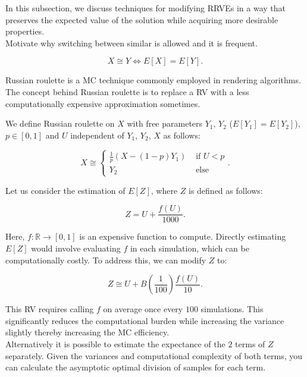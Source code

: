 \documentclass[a4paper,12pt]{article}
\begin{document}
In this subsection, we discuss techniques for modifying RRVEs
in a way that preserves the expected value of the solution while
acquiring more desirable properties. \\

Motivate why switching between similar is allowed and it is frequent.
\begin{notation}[$\cong$]
    \[
        X \cong Y \iff E[X]=E[Y]
        .\]
\end{notation}

Russian roulette is a MC technique commonly employed in rendering algorithms.
The concept behind Russian roulette is to replace a RV with a
less computationally expensive approximation sometimes.

\begin{definition} \label{Russian roulette}
    We define Russian roulette on $X$ with free parameters
    $Y_{1}$, $Y_{2}$ ($E[Y_{1}] = E[Y_{2}]$), $p \in [0,1]$
    and $U$ independent of $Y_{1}$, $Y_{2}$, $X$
    as follows:

    \begin{equation}
        X \cong
        \begin{cases}
            \frac{1}{p}(X - (1-p)Y_{1}) & \text{ if } U < p \\
            Y_{2}                       & \text{ else }
        \end{cases}.
    \end{equation}
\end{definition}

\begin{example} \label{ex:simple russian roulette}
    Let us consider the estimation of $E[Z]$, where $Z$ is defined as follows:

    \begin{equation}
        Z = U + \frac{f(U)}{1000}.
    \end{equation}

    Here, $f:\mathbb{R} \rightarrow [0,1]$ is an expensive function to compute.
    Directly estimating $E[Z]$ would involve evaluating $f$ in each simulation,
    which can be computationally costly. To address this, we can modify $Z$ to:

    \begin{equation}
        Z \cong U + B\left(\frac{1}{100}\right)\frac{f(U)}{10}.
    \end{equation}

    This RV requires calling $f$ on
    average once every $100$ simulations. This significantly reduces the
    computational burden while increasing the variance slightly thereby increasing
    the MC efficiency.\\
    Alternatively it is possible to estimate
    the expectance of the $2$ terms of $Z$ separately. Given the variances and
    computational complexity of both terms, you can calculate the asymptotic optimal
    division of samples for each term.
\end{example}
\end{document}
